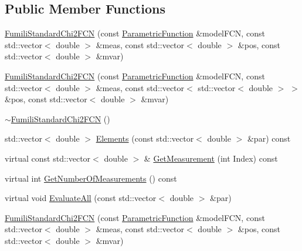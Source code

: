 \subsection*{Public Member Functions}
\begin{DoxyCompactItemize}
\item 
\mbox{\hyperlink{classROOT_1_1Minuit2_1_1FumiliStandardChi2FCN_a1b86269a64b1368ac6d33de89f32674d}{Fumili\+Standard\+Chi2\+F\+CN}} (const \mbox{\hyperlink{classROOT_1_1Minuit2_1_1ParametricFunction}{Parametric\+Function}} \&model\+F\+CN, const std\+::vector$<$ double $>$ \&meas, const std\+::vector$<$ double $>$ \&pos, const std\+::vector$<$ double $>$ \&mvar)
\item 
\mbox{\hyperlink{classROOT_1_1Minuit2_1_1FumiliStandardChi2FCN_a9a18cdf86c47d62aed4298120a44a601}{Fumili\+Standard\+Chi2\+F\+CN}} (const \mbox{\hyperlink{classROOT_1_1Minuit2_1_1ParametricFunction}{Parametric\+Function}} \&model\+F\+CN, const std\+::vector$<$ double $>$ \&meas, const std\+::vector$<$ std\+::vector$<$ double $>$ $>$ \&pos, const std\+::vector$<$ double $>$ \&mvar)
\item 
\mbox{\hyperlink{classROOT_1_1Minuit2_1_1FumiliStandardChi2FCN_a74d68d4f8ee38aff21a0e5a4e7d4173b}{$\sim$\+Fumili\+Standard\+Chi2\+F\+CN}} ()
\item 
std\+::vector$<$ double $>$ \mbox{\hyperlink{classROOT_1_1Minuit2_1_1FumiliStandardChi2FCN_ae7683cdbfa4160902add963d2132ab76}{Elements}} (const std\+::vector$<$ double $>$ \&par) const
\item 
virtual const std\+::vector$<$ double $>$ \& \mbox{\hyperlink{classROOT_1_1Minuit2_1_1FumiliStandardChi2FCN_aed6181ee2996e090bc4aeb267771390e}{Get\+Measurement}} (int Index) const
\item 
virtual int \mbox{\hyperlink{classROOT_1_1Minuit2_1_1FumiliStandardChi2FCN_a27414beb35c9c18156e6b3781aaf587f}{Get\+Number\+Of\+Measurements}} () const
\item 
virtual void \mbox{\hyperlink{classROOT_1_1Minuit2_1_1FumiliStandardChi2FCN_a76f42b6e5d2a92961a9fd8feca38b582}{Evaluate\+All}} (const std\+::vector$<$ double $>$ \&par)
\item 
\mbox{\hyperlink{classROOT_1_1Minuit2_1_1FumiliStandardChi2FCN_a1b86269a64b1368ac6d33de89f32674d}{Fumili\+Standard\+Chi2\+F\+CN}} (const \mbox{\hyperlink{classROOT_1_1Minuit2_1_1ParametricFunction}{Parametric\+Function}} \&model\+F\+CN, const std\+::vector$<$ double $>$ \&meas, const std\+::vector$<$ double $>$ \&pos, const std\+::vector$<$ double $>$ \&mvar)
\item 

\end{DoxyCompactItemize}

